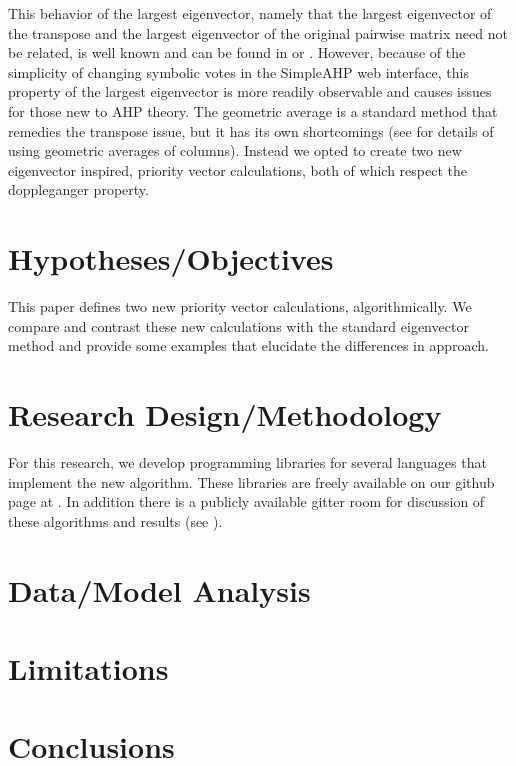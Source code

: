 \documentclass[11pt]{article}
\begin{document}
This behavior of the largest eigenvector, namely that the largest eigenvector
of the transpose and the largest eigenvector of the original pairwise matrix need
not be related, is well known and can be found in \cite{choo2004common} or
\cite{saaty1990eigenvector}.
However, because of the simplicity of changing symbolic votes in the SimpleAHP
web interface, this property of the largest eigenvector is more readily observable
and causes issues for those new to AHP theory.
The geometric average is a standard method that remedies the transpose issue, but
it has its own shortcomings (see \cite{barzilai1994ahp} for details of using
geometric averages of columns).  Instead we opted to create two new
eigenvector inspired, priority vector calculations, both of which respect the
doppleganger property.

\section{Hypotheses/Objectives}
This paper defines two new priority vector calculations, algorithmically.
We compare and contrast these new calculations with the standard eigenvector
method and provide some examples that elucidate the differences in approach.

\section{Research Design/Methodology}
For this research, we develop programming libraries for several languages that
implement the new algorithm.  These libraries are freely available on our github
page at \cite{githubahppri}.  In addition there is a publicly available gitter
room for discussion of these algorithms and results (see \cite{gitterahppri}).

\section{Data/Model Analysis}

\section{Limitations}

\section{Conclusions}




\end{document}
